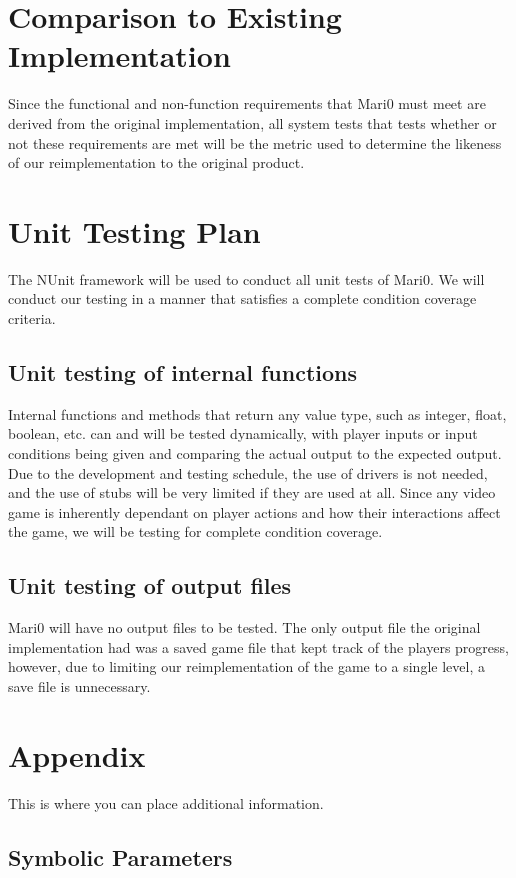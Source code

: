 \documentclass[12pt, titlepage]{article}
\begin{document}
\section{Comparison to Existing Implementation}	
	Since the functional and non-function requirements that Mari0 must meet are derived from the original implementation, all system tests that tests whether or not these requirements are met will be the metric used to determine the likeness of our reimplementation to the original product.
\section{Unit Testing Plan}
	The NUnit framework will be used to conduct all unit tests of Mari0. We will conduct our testing in a manner that satisfies a complete condition coverage criteria.
\subsection{Unit testing of internal functions}
	Internal functions and methods that return any value type, such as integer, float, boolean, etc. can and will be tested dynamically, with player inputs or input conditions being given and comparing the actual output to the expected output. Due to the development and testing schedule, the use of drivers is not needed, and the use of stubs will be very limited if they are used at all. Since any video game is inherently dependant on player actions and how their interactions affect the game, we will be testing for complete condition coverage.
\subsection{Unit testing of output files}		
	Mari0 will have no output files to be tested. The only output file the original implementation had was a saved game file that kept track of the players progress, however, due to limiting our reimplementation of the game to a single level, a save file is unnecessary.




\newpage

\section{Appendix}

This is where you can place additional information.

\subsection{Symbolic Parameters}
\end{document}

